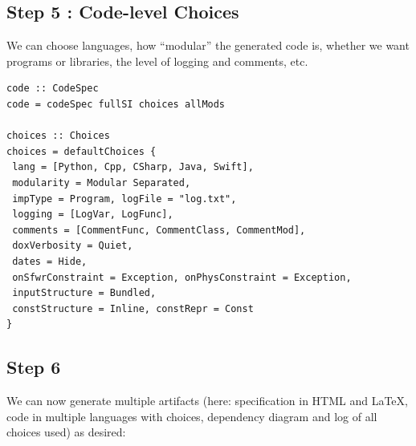 \documentclass[sigconf,review,anonymous=false]{acmart}
\begin{document}
%
%
%
%

\subsection*{Step 5 : Code-level Choices}

We can choose languages, how ``modular'' the generated code is, whether we
want programs or libraries, the level of logging and comments, etc.

\begin{lstlisting}
code :: CodeSpec
code = codeSpec fullSI choices allMods

choices :: Choices
choices = defaultChoices {
 lang = [Python, Cpp, CSharp, Java, Swift], 
 modularity = Modular Separated,
 impType = Program, logFile = "log.txt", 
 logging = [LogVar, LogFunc],
 comments = [CommentFunc, CommentClass, CommentMod], 
 doxVerbosity = Quiet,
 dates = Hide, 
 onSfwrConstraint = Exception, onPhysConstraint = Exception,
 inputStructure = Bundled, 
 constStructure = Inline, constRepr = Const
}
\end{lstlisting}

\subsection*{Step 6}

We can now generate multiple artifacts (here: specification in HTML and \LaTeX,
code in multiple languages with choices, dependency diagram and log of all
choices used) as desired:
\end{document}
